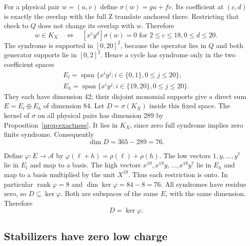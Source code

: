\documentclass{article}
\DeclareMathOperator{\rank}{rank}
\DeclareMathOperator{\Span}{span}
\begin{document}
For a physical pair \(w = (u,v)\) define \(\sigma(w) = gu + fv\). Its coefficient at
\((c,d)\) is exactly the overlap with the full Z translate anchored there. Restricting that
check to \(Q\) does not change its overlap with \(w\). Therefore
\begin{equation}
  w \in K_X \quad \Longleftrightarrow \quad
  [x^c y^d]\sigma(w) = 0
  \text{ for } 2 \le c \le 18, 0 \le d \le 20.
\end{equation}
The syndrome is supported in \([0,20]^2\), because the operator lies in \(Q\) and both
generator supports lie in \([0,2]^2\). Hence a cycle has syndrome only in the two coefficient
spaces
\begin{gather}
  E_l = \Span\{x^i y^j : i \in \{0,1\}, 0 \le j \le 20\}, \\
  E_h = \Span\{x^i y^j : i \in \{19,20\}, 0 \le j \le 20\}.
\end{gather}
They each have dimension 42; their disjoint monomial supports give a direct sum
\(E = E_l \oplus E_h\) of dimension 84. Let \(D = \sigma(K_X)\) inside this fixed space. The
kernel of \(\sigma\) on all physical pairs has dimension 289 by Proposition~\ref{prop:exactness}.
It lies in \(K_X\), since zero full syndrome implies zero finite syndrome. Consequently
\begin{equation}
  \dim D = 365 - 289 = 76.
\end{equation}

Define \(\varphi \colon E \to \mathcal{A}\) by \(\varphi(\ell + h) = \rho(\ell) + \rho(h)\).
The low vectors \(1, y, \dots, y^7\) lie in \(E_l\) and map to a basis. The high vectors
\(x^{19}, x^{19} y, \dots, x^{19} y^7\) lie in \(E_h\) and map to a basis multiplied by the
unit \(X^{19}\). Thus each restriction is onto. In particular \(\rank \varphi = 8\) and
\(\dim \ker \varphi = 84 - 8 = 76\). All syndromes have residue zero, so
\(D \subseteq \ker \varphi\). Both are subspaces of the same \(E\), with the same dimension.
Therefore
\begin{equation}
  D = \ker \varphi.
\end{equation}

\subsection{Stabilizers have zero low charge}\label{sec:x-stabilizers}
\end{document}
